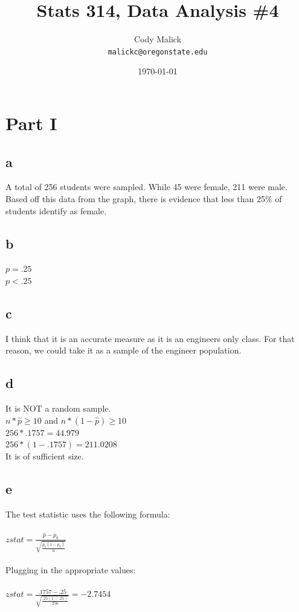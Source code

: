 \documentclass[10pt,letterpaper]{article}
\begin{document}
  \title{Stats 314, Data Analysis \#4}
  \author{Cody Malick\\
  \texttt{malickc@oregonstate.edu}}
  \date{\today}
  \maketitle

\section*{Part I}
\subsection*{a}
A total of 256 students were sampled. While 45 were female, 211 were male. 
Based off this data from the graph, there is evidence that less than 25\% of
students identify as female. 

\subsection*{b}
$p=.25$\\
$p<.25$\\

\subsection*{c}
I think that it is an accurate measure as it is an engineers only class. For
that reason, we could take it as a sample of the engineer population. 

\subsection*{d}
It is NOT a random sample.\\
$n*\hat{p} \geq 10$ and $n*(1-\hat{p}) \ge 10$\\
$256*.1757 = 44.979$\\
$256*(1-.1757) = 211.0208$\\ 

It is of sufficient size.

\subsection*{e}
The test statistic uses the following formula:\\\\
$z stat=\frac{\hat{p}-p_0}{\sqrt{\frac{p_0(1-p_0)}{n}}}$\\\\
Plugging in the appropriate values:\\\\
$z stat=\frac{.1757-.25}{\sqrt{\frac{.25(1-.25)}{256}}}=-2.7454$\\
\end{document}
